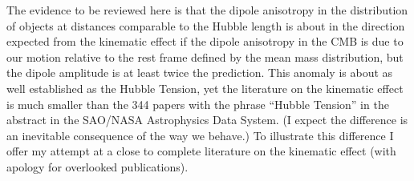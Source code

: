 \documentclass[fleqn,usenatbib]{mnras}
\begin{document}
The evidence to be reviewed here is that the dipole anisotropy in the distribution of objects at distances comparable to the Hubble length is about in the direction expected from the kinematic effect if the dipole anisotropy in the CMB is due to our motion relative to the rest frame defined by the mean mass distribution, but the dipole amplitude is at least twice the prediction. This anomaly is about as well established as the Hubble Tension, yet the  literature on the kinematic effect is much smaller than the 344 papers with the phrase ``Hubble Tension'' in the abstract in the SAO/NASA Astrophysics Data System. (I expect the difference is an inevitable consequence of the way we behave.) To illustrate this difference I offer my attempt at a close to complete literature on the kinematic effect (with apology for overlooked publications). 
\end{document}

